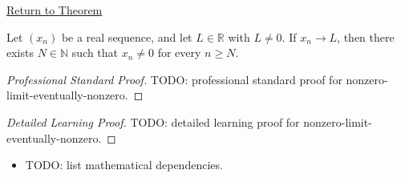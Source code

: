 \newpage
{}
\label{prf:nonzero-limit-eventually-nonzero}

\begin{remark*}[Return]
\hyperref[thm:nonzero-limit-eventually-nonzero]{Return to Theorem}
\end{remark*}

\begin{theorem*}
Let $(x_n)$ be a real sequence, and let $L\in\mathbb{R}$ with $L\neq 0$.
If $x_n\to L$, then there exists $N\in\mathbb{N}$ such that $x_n\neq 0$
for every $n\ge N$.

\smallskip
\noindent
\end{theorem*}

\begin{proof}[Professional Standard Proof]
\LRAProofBodyStart
TODO: professional standard proof for nonzero-limit-eventually-nonzero.
\end{proof}

\begin{proof}[Detailed Learning Proof]
\LRAProofBodyStart
TODO: detailed learning proof for nonzero-limit-eventually-nonzero.
\end{proof}

\begin{remark*}
\end{remark*}

\begin{dependencies}
\begin{itemize}
  \item TODO: list mathematical dependencies.
\end{itemize}
\end{dependencies}

\clearpage
